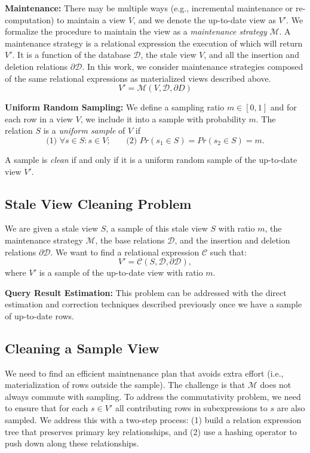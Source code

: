 \vspace{0.5em}

\noindent \textbf{Maintenance:} There may be multiple ways (e.g., incremental maintenance or re-computation) to maintain a view $V$, and we denote the up-to-date view as $V'$.
We formalize the procedure to maintain the view as a \emph{maintenance strategy} $\mathcal{M}$.
A maintenance strategy is a relational expression the execution of which will return $V'$.
It is a function of the database $\mathcal{D}$, the stale view $V$, and all the insertion and deletion relations $\partial \mathcal{D}$. 
In this work, we consider maintenance strategies composed of the same relational expressions as materialized views described above.
\[
V' = \mathcal{M}(V,\mathcal{D}, \partial D)
\]

\vspace{0.5em}

\noindent \textbf{Uniform Random Sampling:}
We define a sampling ratio $m\in [0,1]$ and for each row in a view $V$, we include it into a sample with probability $m$.
The relation $S$ is a \emph{uniform sample} of $V$ if
\[\text{(1) } \forall s \in S : s \in V\text{;~~~~~ (2) }Pr(s_1 \in S) =  Pr(s_2 \in S) = m.\]

\vspace{0.5em}

A sample is \emph{clean} if and only if it is a uniform random sample of the up-to-date view $V'$. 

\subsection{Stale View Cleaning Problem}
We are given a stale view $S$, a sample of this stale view $S$ with ratio $m$, the maintenance strategy $\mathcal{M}$, the base relations $\mathcal{D}$, and
the insertion and deletion relations $\partial \mathcal{D}$.
We want to find a relational expression $\mathcal{C}$ such that:
\[
V' = \mathcal{C}(S,\mathcal{D},\partial \mathcal{D}),
\]
where $V'$ is a sample of the up-to-date view with ratio $m$. 

\noindent\textbf{Query Result Estimation: }
This problem can be addressed with the direct estimation and correction techniques 
described previously once we have a sample of up-to-date rows.

\subsection{Cleaning a Sample View}
We need to find an efficient maintnenance plan that avoids extra effort (i.e., materialization of rows outside the sample).
The challenge is that $\mathcal{M}$ does not always commute with sampling.
To address the commutativity problem, we need to ensure that for each $s \in V'$ all contributing rows in subexpressions to $s$ are also sampled. 
We address this with a two-step process: (1) build a relation expression tree that preserves primary key relationships, and (2) use a hashing operator to push down along these relationships.


